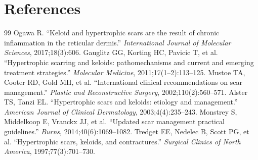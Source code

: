 \section*{References}
\begin{thebibliography}{99}
 Ogawa R. ``Keloid and hypertrophic scars are the result of chronic inflammation in the reticular dermis.'' \textit{International Journal of Molecular Sciences}, 2017;18(3):606.
 Gauglitz GG, Korting HC, Pavicic T, et al. ``Hypertrophic scarring and keloids: pathomechanisms and current and emerging treatment strategies.'' \textit{Molecular Medicine}, 2011;17(1--2):113--125.
 Mustoe TA, Cooter RD, Gold MH, et al. ``International clinical recommendations on scar management.'' \textit{Plastic and Reconstructive Surgery}, 2002;110(2):560--571.
 Alster TS, Tanzi EL. ``Hypertrophic scars and keloids: etiology and management.'' \textit{American Journal of Clinical Dermatology}, 2003;4(4):235--243.
 Monstrey S, Middelkoop E, Vranckx JJ, et al. ``Updated scar management practical guidelines.'' \textit{Burns}, 2014;40(6):1069--1082.
 Tredget EE, Nedelec B, Scott PG, et al. ``Hypertrophic scars, keloids, and contractures.'' \textit{Surgical Clinics of North America}, 1997;77(3):701--730.

\end{thebibliography}
